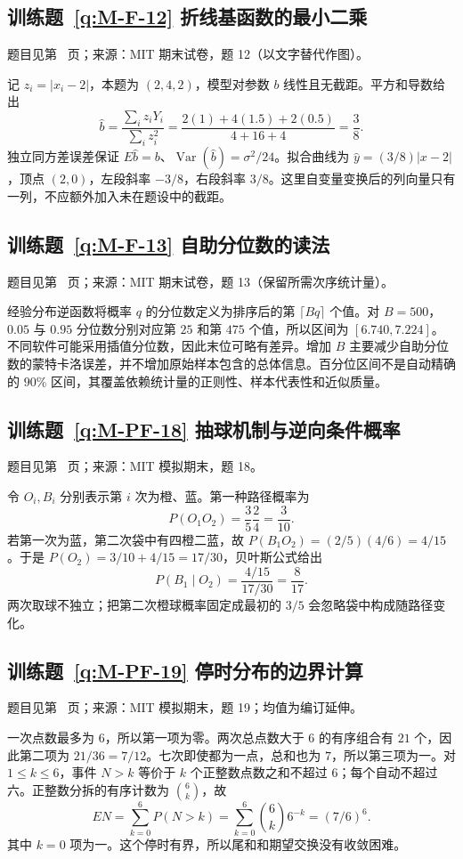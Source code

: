 \documentclass[UTF8,12pt,a4paper,fontset=fandol]{ctexbook}
\begin{document}
\subsection*{训练题~\ref{q:M-F-12} 折线基函数的最小二乘}\label{a:M-F-12}{\small 题目见第~\pageref{q:M-F-12} 页；来源：MIT 期末试卷，题 12（以文字替代作图）。}
\begin{solve}记 $z_i=|x_i-2|$，本题为 $(2,4,2)$，模型对参数 $b$ 线性且无截距。平方和导数给出\[\widehat b=\frac{\sum_i z_iY_i}{\sum_i z_i^2}=\frac{2(1)+4(1.5)+2(0.5)}{4+16+4}=\frac38.\]独立同方差误差保证 $E\widehat b=b$、$\operatorname{Var}(\widehat b)=\sigma^2/24$。拟合曲线为 $\widehat y=(3/8)|x-2|$，顶点 $(2,0)$，左段斜率 $-3/8$，右段斜率 $3/8$。这里自变量变换后的列向量只有一列，不应额外加入未在题设中的截距。\end{solve}

\subsection*{训练题~\ref{q:M-F-13} 自助分位数的读法}\label{a:M-F-13}{\small 题目见第~\pageref{q:M-F-13} 页；来源：MIT 期末试卷，题 13（保留所需次序统计量）。}
\begin{solve}经验分布逆函数将概率 $q$ 的分位数定义为排序后的第 $\lceil Bq\rceil$ 个值。对 $B=500$，$0.05$ 与 $0.95$ 分位数分别对应第 $25$ 和第 $475$ 个值，所以区间为 $[6.740,7.224]$。不同软件可能采用插值分位数，因此末位可略有差异。增加 $B$ 主要减少自助分位数的蒙特卡洛误差，并不增加原始样本包含的总体信息。百分位区间不是自动精确的 $90\%$ 区间，其覆盖依赖统计量的正则性、样本代表性和近似质量。\end{solve}

\subsection*{训练题~\ref{q:M-PF-18} 抽球机制与逆向条件概率}\label{a:M-PF-18}{\small 题目见第~\pageref{q:M-PF-18} 页；来源：MIT 模拟期末，题 18。}
\begin{solve}令 $O_i,B_i$ 分别表示第 $i$ 次为橙、蓝。第一种路径概率为\[P(O_1O_2)=\frac35\frac24=\frac3{10}.\]若第一次为蓝，第二次袋中有四橙二蓝，故 $P(B_1O_2)=(2/5)(4/6)=4/15$。于是 $P(O_2)=3/10+4/15=17/30$，贝叶斯公式给出\[P(B_1\mid O_2)=\frac{4/15}{17/30}=\frac8{17}.\]两次取球不独立；把第二次橙球概率固定成最初的 $3/5$ 会忽略袋中构成随路径变化。\end{solve}

\subsection*{训练题~\ref{q:M-PF-19} 停时分布的边界计算}\label{a:M-PF-19}{\small 题目见第~\pageref{q:M-PF-19} 页；来源：MIT 模拟期末，题 19；均值为编订延伸。}
\begin{solve}一次点数最多为 $6$，所以第一项为零。两次总点数大于 $6$ 的有序组合有 $21$ 个，因此第二项为 $21/36=7/12$。七次即使都为一点，总和也为 $7$，所以第三项为一。对 $1\le k\le6$，事件 $N>k$ 等价于 $k$ 个正整数点数之和不超过 $6$；每个自动不超过六。正整数分拆的有序计数为 $\binom6k$，故\[EN=\sum_{k=0}^6P(N>k)=\sum_{k=0}^6\binom6k6^{-k}=(7/6)^6.\]其中 $k=0$ 项为一。这个停时有界，所以尾和和期望交换没有收敛困难。\end{solve}
\end{document}
